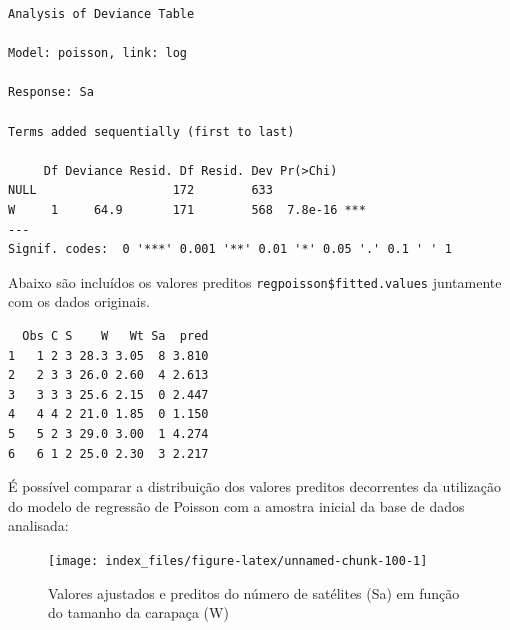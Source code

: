 \documentclass[12pt,brazil,oneside]{book}
\newenvironment{Shaded}{\begin{snugshade}}{\end{snugshade}}
\newcommand{\DataTypeTok}[1]{\textcolor[rgb]{0.13,0.29,0.53}{#1}}
\newcommand{\KeywordTok}[1]{\textcolor[rgb]{0.13,0.29,0.53}{\textbf{#1}}}
\newcommand{\NormalTok}[1]{#1}
\newcommand{\OperatorTok}[1]{\textcolor[rgb]{0.81,0.36,0.00}{\textbf{#1}}}
\newcommand{\StringTok}[1]{\textcolor[rgb]{0.31,0.60,0.02}{#1}}
\begin{document}
\begin{verbatim}
Analysis of Deviance Table

Model: poisson, link: log

Response: Sa

Terms added sequentially (first to last)

     Df Deviance Resid. Df Resid. Dev Pr(>Chi)    
NULL                   172        633             
W     1     64.9       171        568  7.8e-16 ***
---
Signif. codes:  0 '***' 0.001 '**' 0.01 '*' 0.05 '.' 0.1 ' ' 1
\end{verbatim}

Abaixo são incluídos os valores preditos \texttt{regpoisson\$fitted.values} juntamente com os dados originais.

\begin{Shaded}
\end{Shaded}

\begin{verbatim}
  Obs C S    W   Wt Sa  pred
1   1 2 3 28.3 3.05  8 3.810
2   2 3 3 26.0 2.60  4 2.613
3   3 3 3 25.6 2.15  0 2.447
4   4 4 2 21.0 1.85  0 1.150
5   5 2 3 29.0 3.00  1 4.274
6   6 1 2 25.0 2.30  3 2.217
\end{verbatim}

É possível comparar a distribuição dos valores preditos decorrentes da utilização do modelo de regressão de Poisson com a amostra inicial da base de dados analisada:

\begin{Shaded}
\end{Shaded}

\begin{figure}[H]

{\centering \texttt{[image: index\_files/figure-latex/unnamed-chunk-100-1]} 

}

\caption{Valores ajustados e preditos do número de satélites (Sa) em função do tamanho da carapaça (W)}\label{fig:unnamed-chunk-100}
\end{figure}
\end{document}
